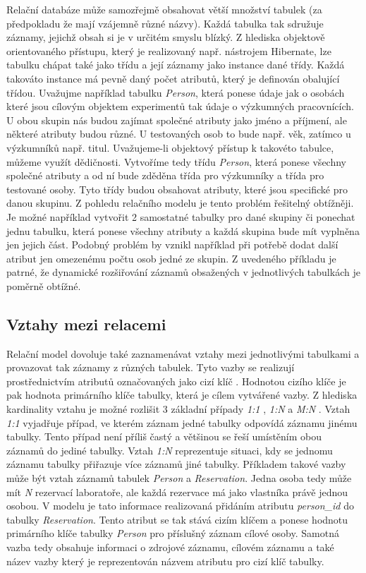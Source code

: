 \documentclass{projekt}
\begin{document}
\hspace{0.65cm}Relační databáze může samozřejmě obsahovat větší množství tabulek (za předpokladu že mají vzájemně různé názvy). Každá tabulka tak sdružuje záznamy, jejichž obsah si je v určitém smyslu blízký. Z hlediska objektově orientovaného přístupu, který je realizovaný např. nástrojem Hibernate, lze tabulku chápat také jako třídu a její záznamy jako instance dané třídy. Každá takováto instance má pevně daný počet atributů, který je definován obalující třídou. Uvažujme například tabulku {\it Person}, která ponese údaje jak o osobách které jsou cílovým objektem experimentů tak údaje o výzkumných pracovnících. U obou skupin nás budou zajímat společné atributy jako jméno a příjmení, ale některé atributy budou různé. U testovaných osob to bude např. věk, zatímco u výzkumníků např. titul. Uvažujeme-li objektový přístup k takovéto tabulce, můžeme využít dědičnosti. Vytvoříme tedy třídu {\it Person}, která ponese všechny společné atributy a od ní bude zděděna třída pro výzkumníky a třída pro testované osoby. Tyto třídy budou obsahovat atributy, které jsou specifické pro danou skupinu. Z pohledu relačního modelu je tento problém řešitelný obtížněji. Je možné například vytvořit 2 samostatné tabulky pro dané skupiny či ponechat jednu tabulku, která ponese všechny atributy a každá skupina bude mít vyplněna jen jejich část. Podobný problém by vznikl například při potřebě dodat další atribut jen omezenému počtu osob jedné ze skupin. Z uvedeného příkladu je patrné, že dynamické rozšiřování záznamů obsažených v jednotlivých tabulkách je poměrně obtížné.

\subsection{Vztahy mezi relacemi}

\hspace{0.65cm}Relační model dovoluje také zaznamenávat vztahy mezi jednotlivými tabulkami a provazovat tak záznamy z různých tabulek. Tyto vazby se realizují prostřednictvím atributů označovaných jako cizí klíč \cite{_20}. Hodnotou cizího klíče je pak hodnota primárního klíče tabulky, která je cílem vytvářené vazby. Z hlediska kardinality vztahu je možné rozlišit 3 základní případy {\it 1:1} , {\it 1:N} a {\it M:N} \cite{_22}. Vztah {\it 1:1} vyjadřuje případ, ve kterém záznam jedné tabulky odpovídá záznamu jinému tabulky. Tento případ není příliš častý a většinou se řeší umístěním obou záznamů do jediné tabulky. Vztah {\it 1:N} reprezentuje situaci, kdy se jednomu záznamu tabulky přiřazuje více záznamů jiné tabulky. Příkladem takové vazby může být vztah záznamů tabulek {\it Person} a {\it Reservation}. Jedna osoba tedy může mít {\it N} rezervací laboratoře, ale každá rezervace má jako vlastníka právě jednou osobou. V modelu je tato informace realizovaná přidáním atributu {\it person\_id} do tabulky {\it Reservation}. Tento atribut se tak stává cizím klíčem a ponese hodnotu primárního klíče tabulky {\it Person} pro příslušný záznam cílové osoby. Samotná vazba tedy obsahuje informaci o zdrojové záznamu, cílovém záznamu a také název vazby který je reprezentován názvem atributu pro cizí klíč tabulky.
\end{document}
